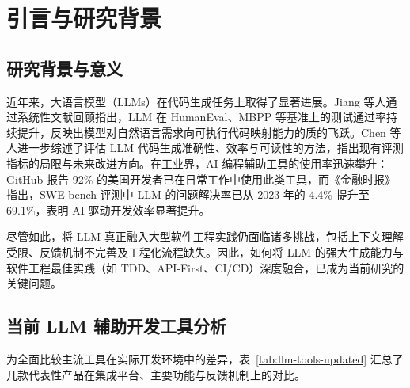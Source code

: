 
\chapter{引言与研究背景}

\section{研究背景与意义}

近年来，大语言模型（LLMs）在代码生成任务上取得了显著进展。Jiang 等人通过系统性文献回顾指出，LLM 在 HumanEval、MBPP 等基准上的测试通过率持续提升，反映出模型对自然语言需求向可执行代码映射能力的质的飞跃\cite{jiang2024survey}。Chen 等人进一步综述了评估 LLM 代码生成准确性、效率与可读性的方法，指出现有评测指标的局限与未来改进方向\cite{chen2024eval}。在工业界，AI 编程辅助工具的使用率迅速攀升：GitHub 报告 92\% 的美国开发者已在日常工作中使用此类工具\cite{githubblog2023}，而《金融时报》指出，SWE-bench 评测中 LLM 的问题解决率已从 2023 年的 4.4\% 提升至 69.1\%，表明 AI 驱动开发效率显著提升\cite{ft2025ai}。

尽管如此，将 LLM 真正融入大型软件工程实践仍面临诸多挑战，包括上下文理解受限、反馈机制不完善及工程化流程缺失。因此，如何将 LLM 的强大生成能力与软件工程最佳实践（如 TDD、API-First、CI/CD）深度融合，已成为当前研究的关键问题。

\section{当前 LLM 辅助开发工具分析}

为全面比较主流工具在实际开发环境中的差异，表~\ref{tab:llm-tools-updated} 汇总了几款代表性产品在集成平台、主要功能与反馈机制上的对比。

